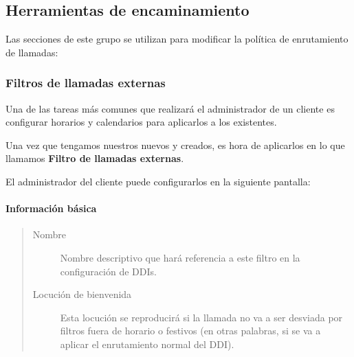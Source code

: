 \documentclass[letterpaper,10pt,spanish]{sphinxmanual}
\begin{document}
\subsection{Herramientas de encaminamiento}
\label{administration_portal/client/vpbx/routing_tools/index::doc}\label{administration_portal/client/vpbx/routing_tools/index:routing-tools}
Las secciones de este grupo se utilizan para modificar la política de enrutamiento de llamadas:
\label{administration_portal/client/vpbx/routing_tools/external_call_filters:external-filters}

\subsubsection{Filtros de llamadas externas}
\label{administration_portal/client/vpbx/routing_tools/external_call_filters:external-call-filters}\label{administration_portal/client/vpbx/routing_tools/external_call_filters:external-filters}\label{administration_portal/client/vpbx/routing_tools/external_call_filters::doc}\label{administration_portal/client/vpbx/routing_tools/external_call_filters:id1}
Una de las tareas más comunes que realizará el administrador de un cliente es configurar horarios y calendarios para aplicarlos a los {\hyperref[administration_portal/brand/views/ddis:ddis]{}} existentes.

Una vez que tengamos nuestros nuevos {\hyperref[administration_portal/client/vpbx/routing_tools/schedules:schedules]{}} y {\hyperref[administration_portal/client/vpbx/routing_tools/calendars:calendars]{}} creados, es hora de aplicarlos en lo que llamamos \textbf{Filtro de llamadas externas}.

El administrador del cliente puede configurarlos en la siguiente pantalla:


\paragraph{Información básica}
\label{administration_portal/client/vpbx/routing_tools/external_call_filters:basic-info}\begin{quote}
\begin{description}
\item[{Nombre}] \leavevmode
Nombre descriptivo que hará referencia a este filtro en la configuración de DDIs.

\item[{Locución de bienvenida}] \leavevmode
Esta locución se reproducirá si la llamada no va a ser desviada por filtros fuera de horario o festivos (en otras palabras, si se va a aplicar el enrutamiento normal del DDI).

\end{description}
\end{quote}
\end{document}
